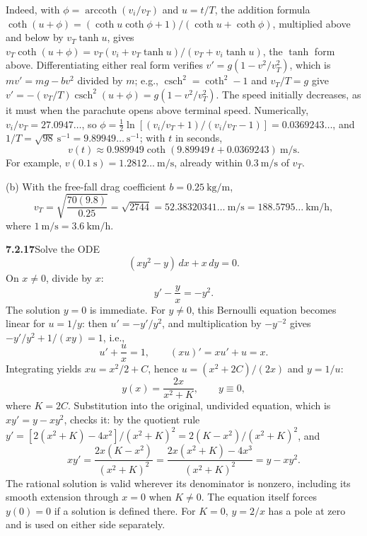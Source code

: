 Indeed, with $\phi=\operatorname{arccoth}(v_i/v_T)$ and $u=t/T$, the
addition formula $\coth(u+\phi)=(\coth u\coth\phi+1)/(\coth u+\coth\phi)$,
multiplied above and below by $v_T\tanh u$, gives
$v_T\coth(u+\phi)=v_T(v_i+v_T\tanh u)/(v_T+v_i\tanh u)$, the
$\tanh$ form above.
Differentiating either real form verifies $v'=g(1-v^2/v_T^2)$, which is
$mv'=mg-bv^2$ divided by $m$; e.g., $\operatorname{csch}^2=\coth^2-1$ and
$v_T/T=g$ give
$v'=-(v_T/T)\operatorname{csch}^2(u+\phi)=g(1-v^2/v_T^2)$. The
speed initially decreases, as it must when the parachute opens above
terminal speed. Numerically, $v_i/v_T=27.0947\ldots$, so
$\phi=\frac12\ln[(v_i/v_T+1)/(v_i/v_T-1)]=0.0369243\ldots$, and
$1/T=\sqrt{98}\ \mathrm{s^{-1}}=9.89949\ldots\ \mathrm{s^{-1}}$; with $t$
in seconds,
\[
v(t)\approx0.989949\coth(9.89949\,t+0.0369243)\ \mathrm{m/s}.
\]
For example, $v(0.1\ \mathrm s)=1.2812\ldots\ \mathrm{m/s}$, already
within $0.3\ \mathrm{m/s}$ of $v_T$.

(b) With the free-fall drag coefficient $b=0.25\ \mathrm{kg/m}$,
\[
\boxed{v_T=\sqrt{\frac{70(9.8)}{0.25}}=\sqrt{2744}
=52.38320341\ldots\ \mathrm{m/s}
=188.5795\ldots\ \mathrm{km/h}},
\]
where $1\ \mathrm{m/s}=3.6\ \mathrm{km/h}$.

\par\bigskip
\noindent\textbf{7.2.17}\quad Solve the ODE
\[
(xy^{2}-y)\,dx+x\,dy=0.
\]
\solution
On $x\ne0$, divide by $x$:
\[
y'-\frac yx=-y^2.
\]
The solution $y=0$ is immediate. For $y\ne0$, this Bernoulli equation
becomes linear for $u=1/y$: then $u'=-y'/y^2$, and multiplication by
$-y^{-2}$ gives $-y'/y^2+1/(xy)=1$, i.e.,
\[
u'+\frac ux=1,\qquad (xu)'=xu'+u=x.
\]
Integrating yields $xu=x^2/2+C$, hence $u=(x^2+2C)/(2x)$ and $y=1/u$:
\[
\boxed{y(x)=\frac{2x}{x^2+K}},\qquad \boxed{y\equiv0},
\]
where $K=2C$. Substitution into the original, undivided equation, which
is $xy'=y-xy^2$, checks it: by the quotient rule
$y'=[2(x^2+K)-4x^2]/(x^2+K)^2=2(K-x^2)/(x^2+K)^2$, and
\[
x y'=\frac{2x(K-x^2)}{(x^2+K)^2}
=\frac{2x(x^2+K)-4x^3}{(x^2+K)^2}
=y-xy^2.
\]
The rational solution is valid wherever its denominator is nonzero,
including its smooth extension through $x=0$ when $K\ne0$. The equation
itself forces $y(0)=0$ if a solution is defined there. For $K=0$,
$y=2/x$ has a pole at zero and is used on either side separately.

